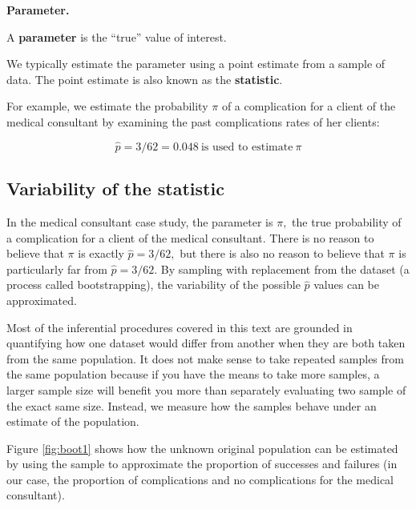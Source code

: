 \documentclass[
  10pt,
  openany]{book}
\theoremstyle{definition}
\theoremstyle{definition}
\theoremstyle{definition}
\theoremstyle{definition}
\theoremstyle{remark}
\begin{document}
\begin{onebox}
\textbf{Parameter.}

A \textbf{parameter} is the ``true'' value of interest.

We typically estimate the parameter using a point estimate from a sample of data.
The point estimate is also known as the \textbf{statistic}.

For example, we estimate the probability \(\pi\) of a complication for a client of the medical consultant by examining the past complications rates of her clients:

\[\hat{p} = 3 / 62 = 0.048~\text{is used to estimate}~\pi\]

\end{onebox}

\subsection{Variability of the statistic}\label{variability-of-the-statistic-1}

In the medical consultant case study, the parameter is \(\pi,\) the true probability of a complication for a client of the medical consultant.
There is no reason to believe that \(\pi\) is exactly \(\hat{p} = 3/62,\) but there is also no reason to believe that \(\pi\) is particularly far from \(\hat{p} = 3/62.\)
By sampling with replacement from the dataset (a process called bootstrapping), the variability of the possible \(\hat{p}\) values can be approximated.

Most of the inferential procedures covered in this text are grounded in quantifying how one dataset would differ from another when they are both taken from the same population.
It does not make sense to take repeated samples from the same population because if you have the means to take more samples, a larger sample size will benefit you more than separately evaluating two sample of the exact same size.
Instead, we measure how the samples behave under an estimate of the population.

Figure \ref{fig:boot1} shows how the unknown original population can be estimated by using the sample to approximate the proportion of successes and failures (in our case, the proportion of complications and no complications for the medical consultant).
\end{document}
